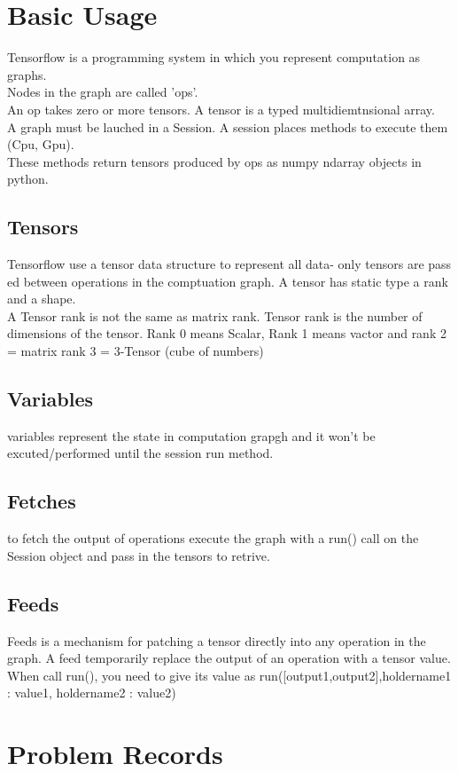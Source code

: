 \documentclass{article}
\begin{document}
\section{Basic Usage}
Tensorflow is a programming system in which you represent computation as graphs.\\
Nodes in the graph are called 'ops'. \\
An op takes zero or more tensors.
A tensor is a typed multidiemtnsional array. \\
A graph must be lauched in a Session. A session places methods to execute them (Cpu, Gpu). \\
These methods return tensors produced by ops as numpy ndarray objects in python.

\subsection{Tensors}
Tensorflow use a tensor data structure to represent all data- only tensors are pass ed between  operations in the comptuation graph.
A tensor has static type a rank and a shape. \\
A Tensor rank is not the same as matrix rank. Tensor rank  is the number of dimensions of the tensor. Rank 0 means Scalar, Rank 1 means vactor and rank 2 = matrix rank 3 = 3-Tensor (cube of numbers)
\subsection{Variables}
variables represent the state in computation grapgh and it won't be excuted/performed until the session run method.

\subsection{Fetches}
to fetch the output of operations execute the graph with a run() call on the Session object and pass in the tensors to retrive.
\subsection{Feeds}
Feeds is a mechanism for patching a tensor directly into any operation in the graph.
A feed temporarily replace the output of an operation with a tensor value. When call run(), you need to give its value as run([output1,output2],{holdername1 : value1, holdername2 : value2})

\section{Problem Records}
\end{document}
